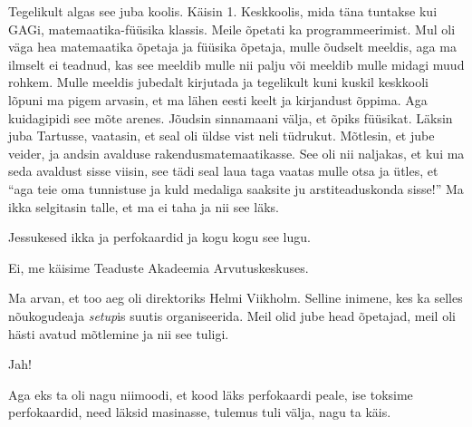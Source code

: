 

Tegelikult algas see juba koolis. Käisin 1. Keskkoolis, mida täna tuntakse kui GAGi, matemaatika-füüsika klassis. Meile õpetati ka programmeerimist. Mul oli väga hea matemaatika õpetaja ja füüsika õpetaja, mulle õudselt meeldis, aga ma ilmselt ei teadnud, kas see meeldib mulle nii palju või meeldib mulle midagi muud rohkem. Mulle meeldis jubedalt kirjutada ja tegelikult kuni kuskil keskkooli lõpuni ma pigem arvasin, et ma lähen eesti keelt ja kirjandust õppima. Aga kuidagipidi see mõte arenes. Jõudsin sinnamaani välja, et õpiks füüsikat. Läksin juba Tartusse, vaatasin, et seal oli üldse vist neli tüdrukut. Mõtlesin, et jube veider, ja andsin avalduse rakendusmatemaatikasse. See oli nii naljakas, et kui ma seda avaldust sisse viisin, see tädi seal laua taga vaatas mulle otsa ja ütles, et \enquote{aga teie oma  tunnistuse ja kuld medaliga saaksite ju arstiteaduskonda sisse!} Ma ikka selgitasin talle, et ma ei taha ja nii see läks. 


Jessukesed ikka ja perfokaardid ja kogu kogu see lugu. 


Ei, me käisime Teaduste Akadeemia Arvutuskeskuses.


Ma arvan, et too aeg oli direktoriks Helmi Viikholm. Selline inimene, kes ka selles nõukogudeaja \emph{setup}is suutis organiseerida. Meil olid jube head õpetajad, meil oli hästi avatud mõtlemine ja nii see tuligi.


Jah!

Aga eks ta oli nagu niimoodi, et kood läks perfokaardi peale, ise toksime perfokaardid, need läksid masinasse, tulemus tuli välja, nagu ta käis. 


